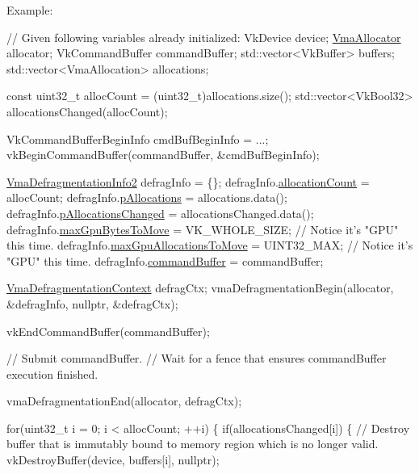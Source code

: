 Example\+:


\begin{DoxyCode}
\textcolor{comment}{// Given following variables already initialized:}
VkDevice device;
\hyperlink{structVmaAllocator}{VmaAllocator} allocator;
VkCommandBuffer commandBuffer;
std::vector<VkBuffer> buffers;
std::vector<VmaAllocation> allocations;


\textcolor{keyword}{const} uint32\_t allocCount = (uint32\_t)allocations.size();
std::vector<VkBool32> allocationsChanged(allocCount);

VkCommandBufferBeginInfo cmdBufBeginInfo = ...;
vkBeginCommandBuffer(commandBuffer, &cmdBufBeginInfo);

\hyperlink{structVmaDefragmentationInfo2}{VmaDefragmentationInfo2} defragInfo = \{\};
defragInfo.\hyperlink{structVmaDefragmentationInfo2_a3cf86ab32c1da779b4923d301a3056ba}{allocationCount} = allocCount;
defragInfo.\hyperlink{structVmaDefragmentationInfo2_a8943f8d65969ce8e2189a1cdf3205e96}{pAllocations} = allocations.data();
defragInfo.\hyperlink{structVmaDefragmentationInfo2_a76d51a644dc7f5405d0cdd0025ecd0cc}{pAllocationsChanged} = allocationsChanged.data();
defragInfo.\hyperlink{structVmaDefragmentationInfo2_a4ddbc898d0afe1518f863a3763628f08}{maxGpuBytesToMove} = VK\_WHOLE\_SIZE; \textcolor{comment}{// Notice it's "GPU" this time.}
defragInfo.\hyperlink{structVmaDefragmentationInfo2_a40d53d33e71ba0b66f844ed63c05a3f6}{maxGpuAllocationsToMove} = UINT32\_MAX; \textcolor{comment}{// Notice it's "GPU" this time.}
defragInfo.\hyperlink{structVmaDefragmentationInfo2_a7f71f39590c5316771493d2333f9c1bd}{commandBuffer} = commandBuffer;

\hyperlink{structVmaDefragmentationContext}{VmaDefragmentationContext} defragCtx;
vmaDefragmentationBegin(allocator, &defragInfo, \textcolor{keyword}{nullptr}, &defragCtx);

vkEndCommandBuffer(commandBuffer);

\textcolor{comment}{// Submit commandBuffer.}
\textcolor{comment}{// Wait for a fence that ensures commandBuffer execution finished.}

vmaDefragmentationEnd(allocator, defragCtx);

\textcolor{keywordflow}{for}(uint32\_t i = 0; i < allocCount; ++i)
\{
    \textcolor{keywordflow}{if}(allocationsChanged[i])
    \{
        \textcolor{comment}{// Destroy buffer that is immutably bound to memory region which is no longer valid.}
        vkDestroyBuffer(device, buffers[i], \textcolor{keyword}{nullptr});


\end{DoxyCode}
